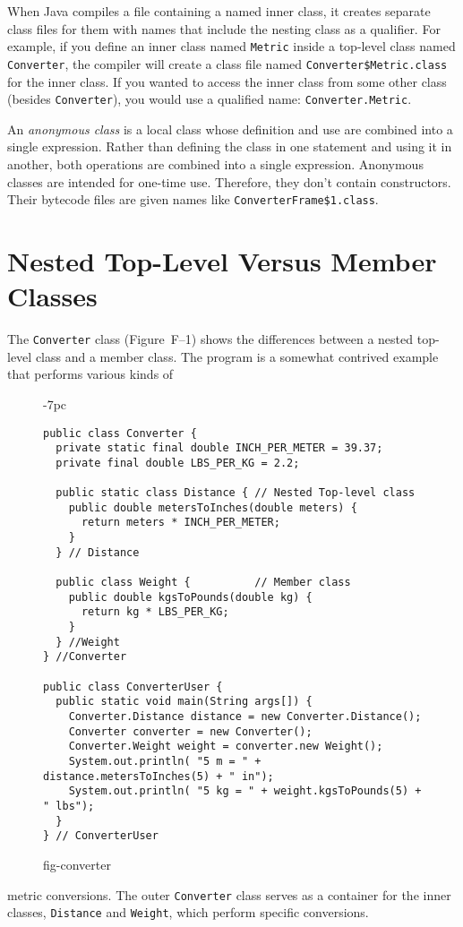 When Java compiles a file containing a named inner class, it creates
separate class files for them with names that include the nesting
class as a qualifier.  For example, if you define an inner class named
{\tt Metric} inside a top-level class named {\tt Converter}, the
compiler will create a class file named {\tt Converter\$Metric.class}
for the inner class.   If you wanted to access the inner class from
some other class (besides {\tt Converter}), you would use a qualified
name: {\tt Converter.Metric}.


An {\it anonymous class} is a local class whose definition and use are
combined into a single expression.  Rather than defining the class in
one statement and using it in another, both operations are combined
into a single expression.  Anonymous classes are intended for one-time
use.  Therefore, they don't contain constructors.  Their bytecode files
are given names like {\tt ConverterFrame\$1.class}.

\section*{Nested Top-Level Versus Member Classes}
\noindent The {\tt Converter} class (Figure~F--1) shows the
differences between a nested top-level class and a member class.   The
program is a somewhat contrived example that performs various kinds of
\begin{figure}[h!]
\jjjprogstart
\begin{jjjlistingleft}[33pc]{-7pc}
\begin{lstlisting}
public class Converter {
  private static final double INCH_PER_METER = 39.37;
  private final double LBS_PER_KG = 2.2;

  public static class Distance { // Nested Top-level class
    public double metersToInches(double meters) {
      return meters * INCH_PER_METER;
    }
  } // Distance

  public class Weight {          // Member class
    public double kgsToPounds(double kg) {
      return kg * LBS_PER_KG;
    }
  } //Weight
} //Converter

public class ConverterUser {
  public static void main(String args[]) {
    Converter.Distance distance = new Converter.Distance();
    Converter converter = new Converter();
    Converter.Weight weight = converter.new Weight();
    System.out.println( "5 m = " + distance.metersToInches(5) + " in");
    System.out.println( "5 kg = " + weight.kgsToPounds(5) + " lbs");
  }
} // ConverterUser
\end{lstlisting}
\end{jjjlistingleft}
{fig-converter}
\end{figure}
metric conversions.  The outer {\tt Converter} class serves as a
container for the inner classes, {\tt Distance} and {\tt Weight},
which perform specific conversions.



